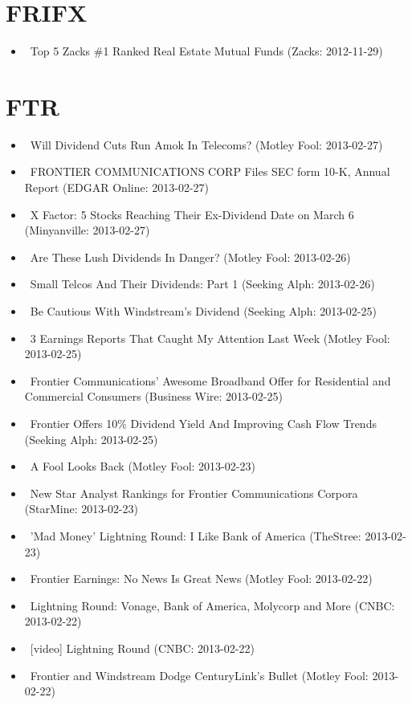 \documentclass[11pt,asymmetric]{article}
\begin{document}
\section*{FRIFX}
\begin{itemize}
\item\ Top 5 Zacks \#1 Ranked Real Estate Mutual Funds (Zacks: 2012-11-29)
\end{itemize}

\section*{FTR}
\begin{itemize}
\item\ Will Dividend Cuts Run Amok In Telecoms? (Motley Fool: 2013-02-27)
\item\ FRONTIER COMMUNICATIONS CORP Files SEC form 10-K, Annual Report (EDGAR Online: 2013-02-27)
\item\ X Factor: 5 Stocks Reaching Their Ex-Dividend Date on March 6 (Minyanville: 2013-02-27)
\item\ Are These Lush Dividends In Danger? (Motley Fool: 2013-02-26)
\item\ Small Telcos And Their Dividends: Part 1 (Seeking Alph: 2013-02-26)
\item\ Be Cautious With Windstream's Dividend (Seeking Alph: 2013-02-25)
\item\ 3 Earnings Reports That Caught My Attention Last Week (Motley Fool: 2013-02-25)
\item\ Frontier Communications’ Awesome Broadband Offer for Residential and Commercial Consumers (Business Wire: 2013-02-25)
\item\ Frontier Offers 10\% Dividend Yield And Improving Cash Flow Trends (Seeking Alph: 2013-02-25)
\item\ A Fool Looks Back (Motley Fool: 2013-02-23)
\item\ New Star Analyst Rankings for Frontier Communications Corpora (StarMine: 2013-02-23)
\item\ 'Mad Money' Lightning Round: I Like Bank of America (TheStree: 2013-02-23)
\item\ Frontier Earnings: No News Is Great News (Motley Fool: 2013-02-22)
\item\ Lightning Round: Vonage, Bank of America, Molycorp and More (CNBC: 2013-02-22)
\item\ [video] Lightning Round (CNBC: 2013-02-22)
\item\ Frontier and Windstream Dodge CenturyLink's Bullet (Motley Fool: 2013-02-22)

\end{itemize}
\end{document}
